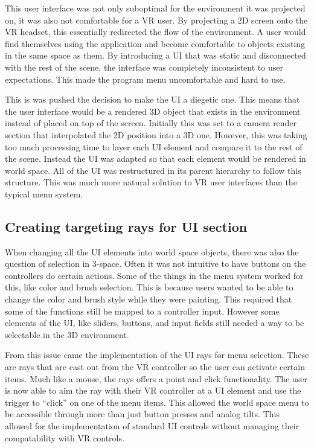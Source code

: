 \documentclass[onecolumn, draftclsnofoot,10pt, compsoc]{IEEEtran}
\begin{document}
This user interface was not only suboptimal for the environment it was projected on, it was also not comfortable for a VR user. By projecting a 2D screen onto the VR headset, this essentially redirected the flow of the environment. A user would find themselves using the application and become comfortable to objects existing in the same space as them. By introducing a UI that was static and disconnected with the rest of the scene, the interface was completely inconsistent to user expectations. This made the program menu uncomfortable and hard to use. 

This is was pushed the decision to make the UI a diegetic one. This means that the user interface would be a rendered 3D object that exists in the environment instead of placed on top of the screen. Initially this was set to a camera render section that interpolated the 2D position into a 3D one. However, this was taking too much processing time to layer each UI element and compare it to the rest of the scene. Instead the UI was adapted so that each element would be rendered in world space. All of the UI was restructured in its parent hierarchy to follow this structure. This was much more natural solution to VR user interfaces than the typical menu system. 

\subsection{Creating targeting rays for UI section}
When changing all the UI elements into world space objects, there was also the question of selection in 3-space. Often it was not intuitive to have buttons on the controllers do certain actions. Some of the things in the menu system worked for this, like color and brush selection. This is because users wanted to be able to change the color and brush style while they were painting. This required that some of the functions still be mapped to a controller input. However some elements of the UI, like sliders, buttons, and input fields still needed a way to be selectable in the 3D environment. 

From this issue came the implementation of the UI rays for menu selection. These are rays that are cast out from the VR controller so the user can activate certain items. Much like a mouse, the rays offers a point and click functionality. The user is now able to aim the ray with their VR controller at a UI element and use the trigger to “click” on one of the menu items. This allowed the world space menu to be accessible through more than just button presses and analog tilts. This allowed for the implementation of standard UI controls without managing their compatability with VR controls. 
\end{document}
